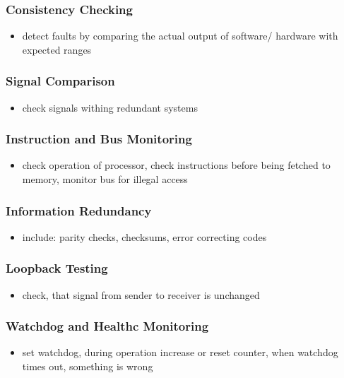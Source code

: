 \documentclass[a4paper, 10pt]{article}
\begin{document}
\subsubsection*{Consistency Checking}
\begin{itemize}
    \item detect faults by comparing the actual output of software/ hardware with expected ranges
\end{itemize}

\subsubsection*{Signal Comparison}
\begin{itemize}
    \item check signals withing redundant systems
\end{itemize}

\subsubsection*{Instruction and Bus Monitoring}
\begin{itemize}
    \item check operation of processor, check instructions before being fetched to memory, monitor bus for illegal access
\end{itemize}

\subsubsection*{Information Redundancy}
\begin{itemize}
    \item include: parity checks, checksums, error correcting codes
\end{itemize}

\subsubsection*{Loopback Testing}
\begin{itemize}
    \item check, that signal from sender to receiver is unchanged
\end{itemize}

\subsubsection*{Watchdog and Healthc Monitoring}
\begin{itemize}
    \item set watchdog, during operation increase or reset counter, when watchdog times out, something is wrong
\end{itemize}
\end{document}
